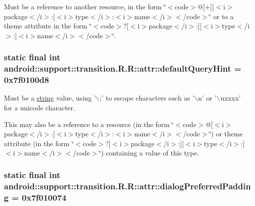 Must be a reference to another resource, in the form \char`\"{}$<$code$>$@\mbox{[}+\mbox{]}\mbox{[}$<$i$>$package$<$/i$>$:\mbox{]}$<$i$>$type$<$/i$>$:$<$i$>$name$<$/i$>$$<$/code$>$\char`\"{} or to a theme attribute in the form \char`\"{}$<$code$>$?\mbox{[}$<$i$>$package$<$/i$>$:\mbox{]}\mbox{[}$<$i$>$type$<$/i$>$:\mbox{]}$<$i$>$name$<$/i$>$$<$/code$>$\char`\"{}. \hypertarget{classandroid_1_1support_1_1transition_1_1_r_1_1attr_baf1c78bfbcfe1a873b226692eaa3b57}{
\subsubsection[{defaultQueryHint}]{\setlength{\rightskip}{0pt plus 5cm}static final int android::support::transition.R.R::attr::defaultQueryHint = 0x7f0100d8}}
\label{classandroid_1_1support_1_1transition_1_1_r_1_1attr_baf1c78bfbcfe1a873b226692eaa3b57}


Must be a \hyperlink{classandroid_1_1support_1_1transition_1_1_r_1_1string}{string} value, using '$\backslash$;' to escape characters such as '$\backslash$n' or '$\backslash$uxxxx' for a unicode character. 

This may also be a reference to a resource (in the form \char`\"{}$<$code$>$@\mbox{[}$<$i$>$package$<$/i$>$:\mbox{]}$<$i$>$type$<$/i$>$:$<$i$>$name$<$/i$>$$<$/code$>$\char`\"{}) or theme attribute (in the form \char`\"{}$<$code$>$?\mbox{[}$<$i$>$package$<$/i$>$:\mbox{]}\mbox{[}$<$i$>$type$<$/i$>$:\mbox{]}$<$i$>$name$<$/i$>$$<$/code$>$\char`\"{}) containing a value of this type. \hypertarget{classandroid_1_1support_1_1transition_1_1_r_1_1attr_018cd272e6206dfcb93435fdb813ac62}{
\subsubsection[{dialogPreferredPadding}]{\setlength{\rightskip}{0pt plus 5cm}static final int android::support::transition.R.R::attr::dialogPreferredPadding = 0x7f010074}}
\label{classandroid_1_1support_1_1transition_1_1_r_1_1attr_018cd272e6206dfcb93435fdb813ac62}


